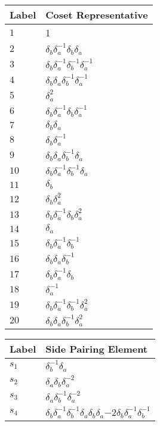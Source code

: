 \documentclass{article}
\begin{document}

\begin{center}
\begin{tabular}{ll}
\toprule
Label & Coset Representative\\
\midrule
$1$ & 1 \\
$2$ & $\delta_b^{}\delta_a^{-1}\delta_b^{}\delta_a^{}$ \\
$3$ & $\delta_b^{}\delta_a^{-1}\delta_b^{-1}\delta_a^{-1}$ \\
$4$ & $\delta_b^{}\delta_a^{}\delta_b^{-1}\delta_a^{-1}$ \\
$5$ & $\delta_a^{2}$ \\
$6$ & $\delta_b^{}\delta_a^{-1}\delta_b^{}\delta_a^{-1}$ \\
$7$ & $\delta_b^{}\delta_a^{}$ \\
$8$ & $\delta_b^{}\delta_a^{-1}$ \\
$9$ & $\delta_b^{}\delta_a^{}\delta_b^{-1}\delta_a^{}$ \\
$10$ & $\delta_b^{}\delta_a^{-1}\delta_b^{-1}\delta_a^{}$ \\
$11$ & $\delta_b^{}$ \\
$12$ & $\delta_b^{}\delta_a^{2}$ \\
$13$ & $\delta_b^{}\delta_a^{-1}\delta_b^{}\delta_a^{2}$ \\
$14$ & $\delta_a^{}$ \\
$15$ & $\delta_b^{}\delta_a^{-1}\delta_b^{-1}$ \\
$16$ & $\delta_b^{}\delta_a^{}\delta_b^{-1}$ \\
$17$ & $\delta_b^{}\delta_a^{-1}\delta_b^{}$ \\
$18$ & $\delta_a^{-1}$ \\
$19$ & $\delta_b^{}\delta_a^{-1}\delta_b^{-1}\delta_a^{2}$ \\
$20$ & $\delta_b^{}\delta_a^{}\delta_b^{-1}\delta_a^{2}$ \\
\bottomrule
\end{tabular}
\hfill
\begin{tabular}{ll}
\toprule
Label & Side Pairing Element\\
\midrule
$s_{1}$ & $\delta_b^{-1}\delta_a^{}$ \\
$s_{2}$ & $\delta_a^{}\delta_b^{}\delta_a^{-2}$ \\
$s_{3}$ & $\delta_a^{}\delta_b^{-1}\delta_a^{-2}$ \\
$s_{4}$ & $\delta_b^{}\delta_a^{-1}\delta_b^{-1}\delta_a^{}\delta_b^{}\delta_a^\
{-2}\delta_b^{}\delta_a^{-1}\delta_b^{-1}$ \\

\end{tabular}
\end{center}
\end{document}
